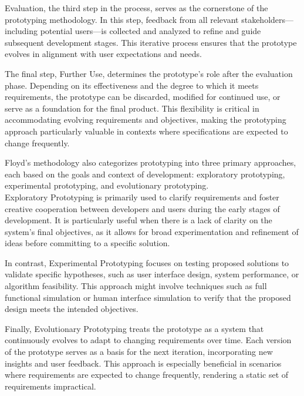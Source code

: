Evaluation, the third step in the process, serves as the cornerstone of the prototyping methodology. In this step,
feedback from all relevant stakeholders—including potential users—is collected and analyzed to refine and guide
subsequent development stages. This iterative process ensures that the prototype evolves in alignment with user
expectations and needs.\autocite[cf.][p.4--5]{floydSystematicLookPrototyping1984}

The final step, Further Use, determines the prototype's role after the evaluation phase. Depending on its effectiveness
and the degree to which it meets requirements, the prototype can be discarded, modified for continued use, or serve as a
foundation for the final product. This flexibility is critical in accommodating evolving requirements and objectives,
making the prototyping approach particularly valuable in contexts where specifications are expected to change
frequently.\autocite[cf.][p.5]{floydSystematicLookPrototyping1984}

Floyd’s methodology also categorizes prototyping into three primary approaches, each based on the goals and context of
development: exploratory prototyping, experimental prototyping, and evolutionary prototyping.
\autocite[cf.][p.6]{floydSystematicLookPrototyping1984}\\ Exploratory Prototyping is
primarily used to clarify requirements and foster creative cooperation between developers and users during the early
stages of development. It is particularly useful when there is a lack of clarity on the system’s final objectives, as it
allows for broad experimentation and refinement of ideas before committing to a specific solution.
\autocite[cf.][p.6--7]{floydSystematicLookPrototyping1984}

In contrast, Experimental Prototyping focuses on testing proposed solutions to validate specific hypotheses, such as
user interface design, system performance, or algorithm feasibility. This approach might involve techniques such as full
functional simulation or human interface simulation to verify that the proposed design meets the intended objectives.
\autocite[cf.][p.8--10]{floydSystematicLookPrototyping1984}

Finally, Evolutionary Prototyping treats the prototype as a system that continuously evolves to adapt to changing
requirements over time. Each version of the prototype serves as a basis for the next iteration, incorporating new
insights and user feedback. This approach is especially beneficial in scenarios where requirements are expected to
change frequently, rendering a static set of requirements impractical.
\autocite[cf.][p.10--12]{floydSystematicLookPrototyping1984}

